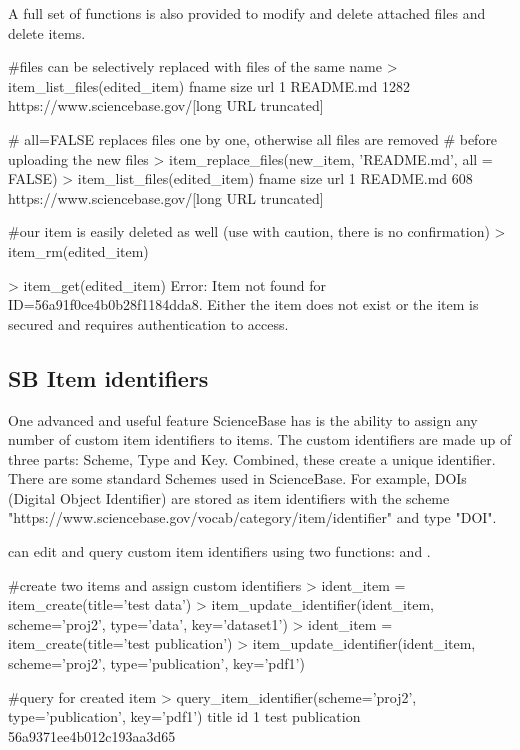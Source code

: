 A full set of functions is also provided to modify and delete attached 
files and delete items. 

\begin{example}
#files can be selectively replaced with files of the same name
> item_list_files(edited_item)
      fname size     url
1 README.md 1282     https://www.sciencebase.gov/[long URL truncated]

# all=FALSE replaces files one by one, otherwise all files are removed
# before uploading the new files
> item_replace_files(new_item, 'README.md', all = FALSE)
> item_list_files(edited_item)
      fname size     url
1 README.md 608     https://www.sciencebase.gov/[long URL truncated]

#our item is easily deleted as well (use with caution, there is no confirmation)
> item_rm(edited_item)

> item_get(edited_item)
Error: Item not found for ID=56a91f0ce4b0b28f1184dda8. Either the item does 
not exist or the item is secured and requires authentication to access.
\end{example}


\subsection{SB Item identifiers}
One advanced and useful feature ScienceBase has is the ability to assign any 
number of custom item identifiers to items. The custom identifiers are made up 
of three parts: Scheme, Type and Key. Combined, these create a unique identifier. 
There are some standard Schemes used in ScienceBase. For example, DOIs (Digital 
Object Identifier) are stored as item identifiers with the scheme 
"https://www.sciencebase.gov/vocab/category/item/identifier" and type "DOI". 

 can edit and query custom item identifiers using two functions:
 and . 

\begin{example}
#create two items and assign custom identifiers
> ident_item = item_create(title='test data')
> item_update_identifier(ident_item, scheme='proj2', type='data', key='dataset1')
> ident_item = item_create(title='test publication')
> item_update_identifier(ident_item, scheme='proj2', type='publication', key='pdf1')

#query for created item
> query_item_identifier(scheme='proj2', type='publication', key='pdf1')
             title                       id
1 test publication 56a9371ee4b012c193aa3d65

\end{example}

